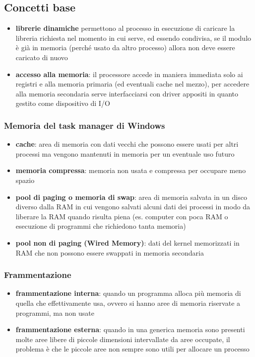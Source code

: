 \documentclass[a4paper]{article}
\begin{document}
\subsection{Concetti base}
\begin{itemize}
	\item \textbf{librerie dinamiche} permettono al processo in esecuzione di caricare la libreria richiesta nel momento in cui
	serve, ed essendo condivisa, se il modulo è già in memoria (perché usato da altro processo) allora non deve essere caricato
	di nuovo
	\item \textbf{accesso alla memoria}: il processore accede in maniera immediata solo ai registri e alla memoria primaria (ed
	eventuali cache nel mezzo), per accedere alla memoria secondaria serve interfacciarsi con driver appositi in quanto gestito
	come dispositivo di I/O
\end{itemize}

\subsubsection*{Memoria del task manager di Windows}
\begin{itemize}
	\item \textbf{cache}: area di memoria con dati vecchi che possono essere usati per altri processi ma vengono mantenuti
	in memoria per un eventuale uso futuro
	\item \textbf{memoria compressa}: memoria non usata e compressa per occupare meno spazio
	\item \textbf{pool di paging o memoria di swap}: area di memoria salvata in un disco diverso dalla RAM in cui vengono
	salvati alcuni dati dei processi in modo da liberare la RAM quando risulta piena (es. computer con poca RAM o esecuzione
	di programmi che richiedono tanta memoria)
	\item \textbf{pool non di paging (Wired Memory)}: dati del kernel memorizzati in RAM che non possono essere swappati in memoria
	secondaria
\end{itemize}

\subsubsection*{Frammentazione}
\begin{itemize}
	\item \textbf{frammentazione interna}: quando un programma alloca più memoria di quella che effettivamente usa, ovvero si
	hanno aree di memoria riservate a programmi, ma non usate
	\item \textbf{frammentazione esterna}: quando in una generica memoria sono presenti molte aree libere di piccole dimensioni
	intervallate da aree occupate, il problema è che le piccole aree non sempre sono utili per allocare un processo
\end{itemize}
\end{document}
